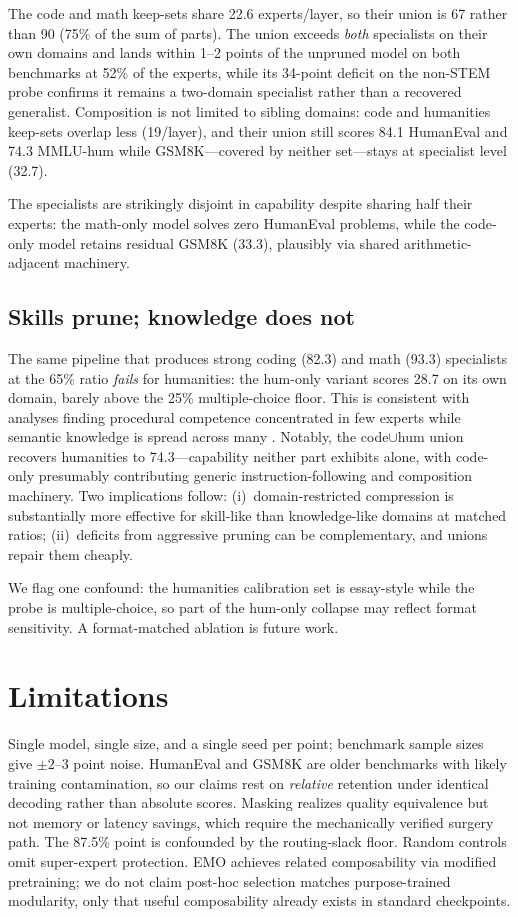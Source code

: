 \documentclass[11pt]{article}
\begin{document}
The code and math keep-sets share 22.6 experts/layer, so their union is 67
rather than 90 (75\% of the sum of parts). The union exceeds \emph{both}
specialists on their own domains and lands within 1--2 points of the unpruned
model on both benchmarks at 52\% of the experts, while its 34-point deficit on
the non-STEM probe confirms it remains a two-domain specialist rather than a
recovered generalist. Composition is not limited to sibling domains: code and
humanities keep-sets overlap less (19/layer), and their union still scores 84.1
HumanEval and 74.3 MMLU-hum while GSM8K---covered by neither set---stays at
specialist level (32.7).

The specialists are strikingly disjoint in capability despite sharing half
their experts: the math-only model solves zero HumanEval problems, while the
code-only model retains residual GSM8K (33.3), plausibly via shared
arithmetic-adjacent machinery.

\subsection{Skills prune; knowledge does not}

The same pipeline that produces strong coding (82.3) and math (93.3)
specialists at the 65\% ratio \emph{fails} for humanities: the hum-only variant
scores 28.7 on its own domain, barely above the 25\% multiple-choice floor.
This is consistent with analyses finding procedural competence concentrated in
few experts while semantic knowledge is spread across many
\cite{whatgets,illusion}. Notably, the code$\cup$hum union recovers humanities
to 74.3---capability neither part exhibits alone, with code-only presumably
contributing generic instruction-following and composition machinery. Two
implications follow: (i)~domain-restricted compression is substantially more
effective for skill-like than knowledge-like domains at matched ratios;
(ii)~deficits from aggressive pruning can be complementary, and unions repair
them cheaply.

We flag one confound: the humanities calibration set is essay-style while the
probe is multiple-choice, so part of the hum-only collapse may reflect format
sensitivity. A format-matched ablation is future work.

\section{Limitations}

Single model, single size, and a single seed per point; benchmark sample sizes
give ${\pm}2$--3 point noise. HumanEval and GSM8K are older benchmarks with
likely training contamination, so our claims rest on \emph{relative} retention
under identical decoding rather than absolute scores. Masking realizes quality
equivalence but not memory or latency savings, which require the mechanically
verified surgery path. The 87.5\% point is confounded by the routing-slack
floor. Random controls omit super-expert protection. EMO \cite{emo} achieves
related composability via modified pretraining; we do not claim post-hoc
selection matches purpose-trained modularity, only that useful composability
already exists in standard checkpoints.
\end{document}
